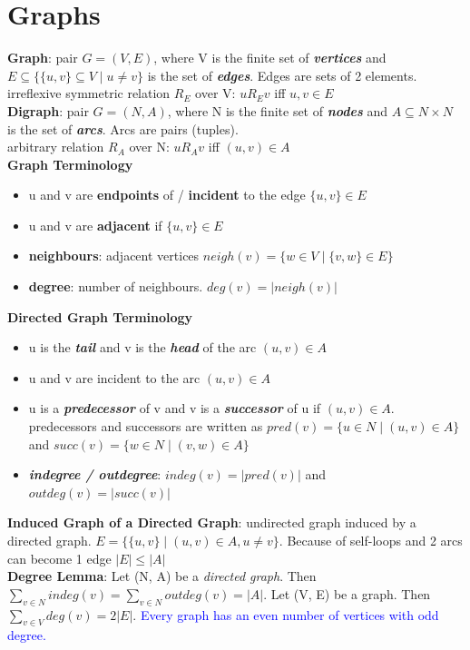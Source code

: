 \section*{Graphs}
\textbf{Graph}: pair $G = (V, E)$, where V is the finite set of \textbf{\textit{vertices}} and $E \subseteq \{\{u, v\} \subseteq V \mid u \neq v\}$ is the set of \textbf{\textit{edges}}. Edges are sets of 2 elements. \\ irreflexive symmetric relation $R_E$ over V: $u R_E v$ iff ${u,v} \in E$\\ 
\textbf{Digraph}: pair $G = (N, A)$, where N is the finite set of \textbf{\textit{nodes}} and $A \subseteq N \times N$ is the set of \textbf{\textit{arcs}}. Arcs are pairs (tuples). \\ arbitrary relation $R_A$ over N: $u R_A v$ iff $(u,v) \in A$\\
\textbf{Graph Terminology}
\begin{itemize}[noitemsep,topsep=0pt,leftmargin=*]
    \item  u and v are \textbf{endpoints} of / \textbf{incident} to the edge $\{u,v\} \in E$
    \item u and v are \textbf{adjacent} if $\{u,v\} \in E$
    \item \textbf{neighbours}: adjacent vertices $neigh(v) = \{w \in V \mid \{v, w\} \in E\}$ 
    \item \textbf{degree}: number of neighbours. $deg(v) = |neigh(v)|$
\end{itemize}
\textbf{Directed Graph Terminology}
\begin{itemize}[noitemsep,topsep=0pt,leftmargin=*]
    \item  u is the \textbf{\textit{tail}} and v is the \textbf{\textit{head}} of the arc $(u,v) \in A$
    \item u and v are incident to the arc $(u,v) \in A$
    \item u is a \textbf{\textit{predecessor}} of v and v is a \textbf{\textit{successor}} of u if $(u, v) \in A$. predecessors and successors are written as $pred(v) = \{u \in N \mid (u,v) \in A \}$ and $succ(v) = \{w \in N \mid (v, w) \in A \}$ 
    \item \textbf{\textit{indegree / outdegree}}: $indeg(v) = |pred(v)|$ and $outdeg(v) = |succ(v)|$ \\
\end{itemize}
\textbf{Induced Graph of a Directed Graph}: undirected graph induced by a directed graph. $E = \{\{u,v\} \mid (u,v) \in A, u \neq v\}$. Because of self-loops and 2 arcs can become 1 edge $|E| \leq |A|$ \\
\textbf{Degree Lemma}: Let (N, A) be a \textit{directed graph}. Then $\sum_{v \in N} indeg(v) = \sum_{v \in N} outdeg(v) = |A|$. Let (V, E) be a g\textit{}raph. Then $\sum_{v \in V} deg(v) = 2|E|$. \textcolor{blue}{Every graph has an even number of vertices with odd degree.} 
